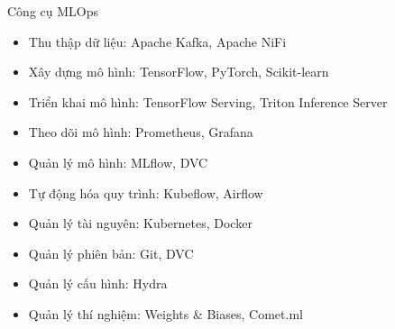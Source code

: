 \documentclass{beamer}
\begin{document}
\begin{frame}{Công cụ MLOps}

        \begin{itemize}
            \item Thu thập dữ liệu: Apache Kafka, Apache NiFi
            \item Xây dựng mô hình: TensorFlow, PyTorch, Scikit-learn
            \item Triển khai mô hình: TensorFlow Serving, Triton Inference Server
            \item Theo dõi mô hình: Prometheus, Grafana
            \item Quản lý mô hình: MLflow, DVC
            \item Tự động hóa quy trình: Kubeflow, Airflow
            \item Quản lý tài nguyên: Kubernetes, Docker
            \item Quản lý phiên bản: Git, DVC
            \item Quản lý cấu hình: Hydra
            \item Quản lý thí nghiệm: Weights \& Biases, Comet.ml
        \end{itemize}

\end{frame}
\end{document}
